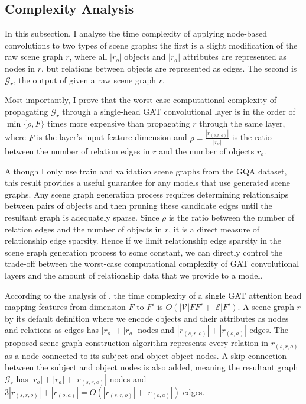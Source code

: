 \subsection{Complexity Analysis}
\label{sec:scene_graph_complexity_analysis}

In this subsection, I analyse the time complexity of applying node-based convolutions to two types of scene graphs: the first is a slight modification of the raw scene graph \(r\), where all \(|r_o|\) objects and \(|r_a|\) attributes are represented as nodes in \(r\), but relations between objects are represented as edges. The second is \(\mathcal{G}_r\), the output of \algorithmcfname{ \ref{algorithm:scene_graph_construction}} given a raw scene graph \(r\).

Most importantly, I prove that the worst-case computational complexity of propagating \(\mathcal{G}_r\) through a single-head GAT convolutional layer is in the order of \(\min\{\rho, F\}\) times more expensive than propagating \(r\) through the same layer, where \(F\) is the layer's input feature dimension and \(\rho = \frac{|r_{(s,r,o)}|}{|r_o|}\) is the ratio between the number of relation edges in \(r\) and the number of objects \(r_o\).

Although I only use train and validation scene graphs from the GQA dataset, this result provides a useful guarantee for any models that use generated scene graphs. Any scene graph generation process requires determining relationships between pairs of objects and then pruning these candidate edges until the resultant graph is adequately sparse. Since \(\rho\) is the ratio between the number of relation edges and the number of objects in \(r\), it is a direct measure of relationship edge sparsity. Hence if we limit relationship edge sparsity in the scene graph generation process to some constant, we can directly control the trade-off between the worst-case computational complexity of GAT convolutional layers and the amount of relationship data that we provide to a model.

According to the analysis of \citeauthor{velivckovic2017graph}, the time complexity of a single GAT attention head mapping features from dimension \(F\) to \(F'\) is \(O(|\mathcal{V}|FF' + |\mathcal{E}|F')\). A scene graph \(r\) by its default definition where we encode objects and their attributes as nodes and relations as edges has \(|r_o| + |r_a|\) nodes and \(|r_{(s, r, o)}| + |r_{(o, a)}|\) edges. The proposed scene graph construction algorithm represents every relation in \(r_{(s, r, o)}\) as a node connected to its subject and object object nodes. A skip-connection between the subject and object nodes is also added, meaning the resultant graph \(\mathcal{G}_r\) has \(|r_o| + |r_a| + |r_{(s, r, o)}|\) nodes and \(3|r_{(s, r, o)}| + |r_{(o, a)}| = O(|r_{(s, r, o)}| + |r_{(o, a)}|)\) edges.

